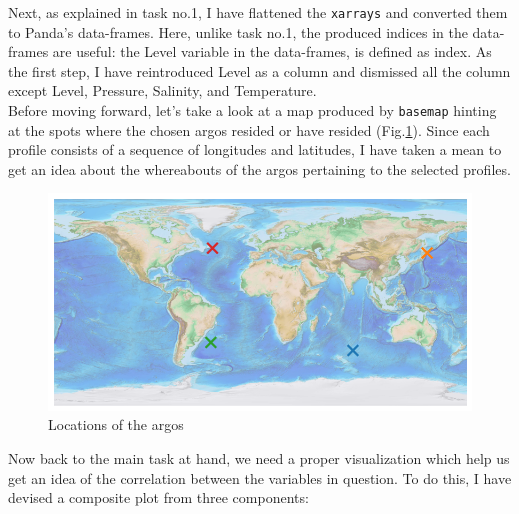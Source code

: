 \documentclass[12pt]{article}
\begin{document}
Next, as explained in task no.1, I have flattened the \verb|xarrays| 
and converted them to Panda's data-frames. Here, unlike
task no.1, the produced indices in the data-frames are useful: 
the Level variable in the data-frames, is defined as 
index. As the first step, I have reintroduced Level as a column and 
dismissed all the column except Level, Pressure, 
Salinity, and Temperature.\\

Before moving forward, let's take a look at a map produced by 
\verb|basemap| hinting at the spots where
the chosen argos resided or have resided (Fig.\ref{map}). 
Since each profile consists of a sequence of longitudes and 
latitudes,
I have taken a mean to get an idea about the whereabouts of 
the argos pertaining to the selected profiles.\\

\begin{figure}[!ht]
    \centering
    \includegraphics[scale=0.7]{map_of_locations.png}
    \caption{Locations of the argos}
    \label{map}
\end{figure}

Now back to the main task at hand, we need a proper 
visualization which help us get an idea of the correlation
between the variables in question. To do this, I have 
devised a composite plot from three components: 
\end{document}

